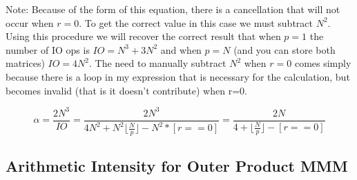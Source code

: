 \documentclass[a4 paper]{article}
\begin{document}
{Note: Because of the form of this equation, there is a cancellation that will not occur when $r=0$. To get the correct value in this case we must subtract $N^2$. Using this procedure we will recover the correct result that when $p=1$ the number of IO ops is $IO=N^3+3N^2$ and when $p=N$ (and you can store both matrices) $IO=4N^2$. The need to manually subtract $N^2$ when $r=0$ comes simply because there is a loop in my expression that is necessary for the calculation, but becomes invalid (that is it doesn't contribute) when r=0.  

$$ \alpha = \frac{2N^3}{IO} = \frac{2N^3}{4N^2 + N^2\bigg\lfloor\frac{N}{p}\bigg\rfloor - N^2*[r==0]} = \frac{2N}{4+\bigg\lfloor\frac{N}{p}\bigg\rfloor - [r==0]}$$

}

\subsection*{Arithmetic Intensity for Outer Product MMM}
\end{document}
